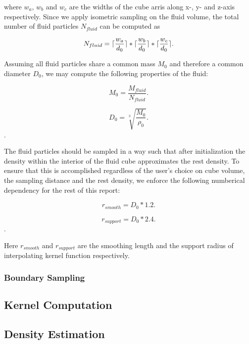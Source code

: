 \documentclass[
	11pt, 
	DIV10,
	ngerman,
	a4paper, 
	oneside, 
	headings=normal, 
	captions=tableheading,
	final, 
	numbers=noenddot
]{scrartcl}
\DeclarePairedDelimiter{\ceil}{\lceil}{\rceil}
\begin{document}
where $ w_{a} $, $ w_{b} $ and $ w_{c} $ are the widths of the cube arris along x-, y- and z-axis respectively. Since we apply isometric sampling on the fluid volume, the total number of fluid particles $ N_{fluid} $ can be computed as

\begin{equation}
	\label{eq2}
	N_{fluid} = \ceil{\frac{w_{a}}{d_{0}}} * \ceil{\frac{w_{b}}{d_{0}}} * \ceil{\frac{w_{c}}{d_{0}}}.
\end{equation}

Assuming all fluid particles share a common mass $ M_{0} $ and therefore a common diameter $ D_{0} $, we may compute the following properties of the fluid:

\begin{equation}
	\label{eq3}
	M_{0} = \frac{M_{fluid}}{N_{fluid}}.
\end{equation}

\begin{equation}
	\label{eq4}
	D_{0} = \sqrt[3]{\frac{M_{0}}{\rho_{0}}}.
\end{equation}.

The fluid particles should be sampled in a way such that after initialization the density within the interior of the fluid cube approximates the rest density. To ensure that this is accomplished regardless of the user's choice on cube volume, the sampling distance and the rest density, we enforce the following numberical dependency for the rest of this report:

\begin{equation}
	\label{eq5}
	r_{smooth} = D_{0} * 1.2.
\end{equation}

\begin{equation}
	\label{eq6}
	r_{support} = D_{0} * 2.4.
\end{equation}.

Here $ r_{smooth} $ and $ r_{support} $ are the smoothing length and the support radius of interpolating kernel function respectively.

\subsubsection{Boundary Sampling}



\subsection{Kernel Computation}
\subsection{Density Estimation}
\end{document}

